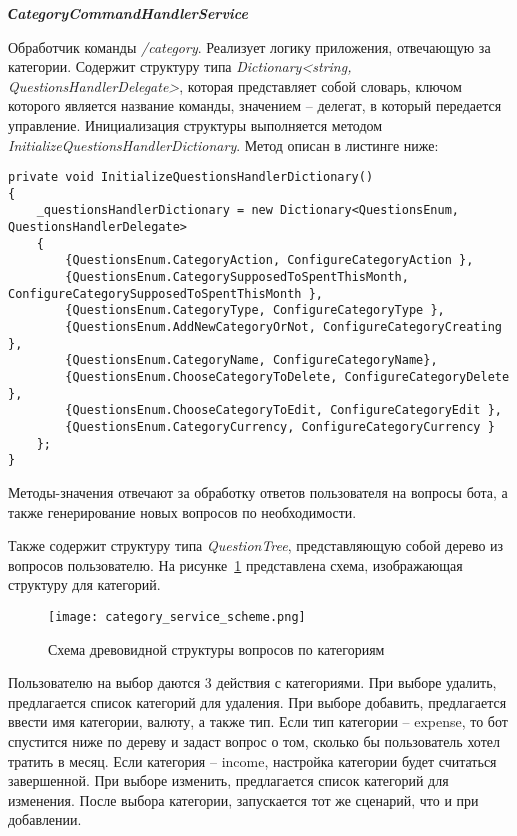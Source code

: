 \textbf{\emph{СategoryCommandHandlerService}}

Обработчик команды \emph{/category}. Реализует логику приложения, отвечающую за категории. Содержит структуру типа \emph{Dictionary<string, QuestionsHandlerDelegate>}, которая представляет собой словарь, ключом которого является название команды, значением – делегат, в который передается управление.
Инициализация структуры выполняется методом \emph{InitializeQuestionsHandlerDictionary}. Метод описан в листинге ниже:

\lstset{style=sharpc}
\begin{lstlisting}
private void InitializeQuestionsHandlerDictionary()
{
	_questionsHandlerDictionary = new Dictionary<QuestionsEnum, QuestionsHandlerDelegate>
	{
		{QuestionsEnum.CategoryAction, ConfigureCategoryAction },
		{QuestionsEnum.CategorySupposedToSpentThisMonth, ConfigureCategorySupposedToSpentThisMonth },
		{QuestionsEnum.CategoryType, ConfigureCategoryType },
		{QuestionsEnum.AddNewCategoryOrNot, ConfigureCategoryCreating },
		{QuestionsEnum.CategoryName, ConfigureCategoryName},
		{QuestionsEnum.ChooseCategoryToDelete, ConfigureCategoryDelete },
		{QuestionsEnum.ChooseCategoryToEdit, ConfigureCategoryEdit },
		{QuestionsEnum.CategoryCurrency, ConfigureCategoryCurrency }
	};
}
\end{lstlisting}

Методы-значения отвечают за обработку ответов пользователя на вопросы бота, а также генерирование новых вопросов по необходимости.

Также содержит структуру типа \emph{QuestionTree}, представляющую собой дерево из вопросов пользователю. На рисунке~\ref{fig:design:server:category_service_scheme} представлена схема, изображающая структуру для категорий.

\begin{figure}[!h]
\centering
	\texttt{[image: category\_service\_scheme.png]}
	\caption{Схема древовидной структуры вопросов по категориям}
	\label{fig:design:server:category_service_scheme}
\end{figure}

Пользователю на выбор даются 3 действия с категориями. При выборе удалить, предлагается список категорий для удаления. При выборе добавить, предлагается ввести имя категории, валюту, а также тип. Если тип категории – expense, то бот спустится ниже по дереву и задаст вопрос о том, сколько бы пользователь хотел тратить в месяц. Если категория – income, настройка категории будет считаться завершенной. При выборе изменить, предлагается список категорий для изменения. После выбора категории, запускается тот же сценарий, что и при добавлении.

